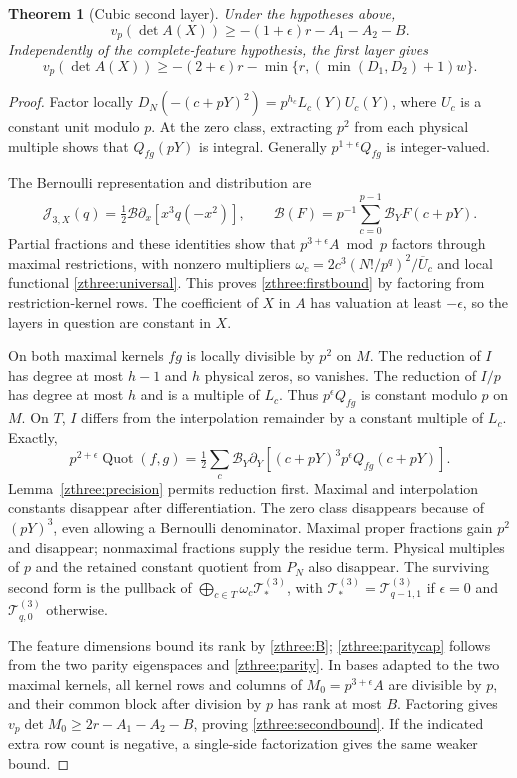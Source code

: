\documentclass[11pt]{article}
\newtheorem{theorem}{Theorem}[section]
\theoremstyle{definition}\newtheorem{definition}[theorem]{Definition}
\theoremstyle{remark}\newtheorem{remark}[theorem]{Remark}
\begin{document}
\begin{theorem}[Cubic second layer]\label{zthree:second}
Under the hypotheses above,
\begin{equation}\label{zthree:secondbound}
 v_p(\det A(X))\ge-(1+\epsilon)r-A_1-A_2-B.
\end{equation}
Independently of the complete-feature hypothesis, the first layer gives
\begin{equation}\label{zthree:firstbound}
 v_p(\det A(X))\ge-(2+\epsilon)r
       -\min\{r,(\min(D_1,D_2)+1)w\}.
\end{equation}
\end{theorem}
\begin{proof}
Factor locally
$D_N(-(c+pY)^2)=p^{h_c}L_c(Y)U_c(Y)$, where $U_c$ is a constant
unit modulo $p$. At the zero class, extracting $p^2$ from each
physical multiple shows that $Q_{fg}(pY)$ is integral. Generally
$p^{1+\epsilon}Q_{fg}$ is integer-valued.

The Bernoulli representation and distribution are
\[
 \mathcal J_{3,X}(q)=\tfrac12\mathcal B\partial_x[x^3q(-x^2)],
 \qquad
 \mathcal B(F)=p^{-1}\sum_{c=0}^{p-1}\mathcal B_Y F(c+pY).
\]
Partial fractions and these identities show that
$p^{3+\epsilon}A\bmod p$ factors through maximal restrictions,
with nonzero multipliers
$\omega_c=2c^3(N!/p^q)^2/\overline U_c$ and local functional
\eqref{zthree:universal}. This proves \eqref{zthree:firstbound} by
factoring from restriction-kernel rows. The coefficient of $X$ in
$A$ has valuation at least $-\epsilon$, so the layers in question
are constant in $X$.

On both maximal kernels $fg$ is locally divisible by $p^2$ on $M$.
The reduction of $I$ has degree at most $h-1$ and $h$ physical zeros,
so vanishes. The reduction of $I/p$ has degree at most $h$ and is
a multiple of $L_c$. Thus $p^\epsilon Q_{fg}$ is constant modulo
$p$ on $M$. On $T$, $I$ differs from the interpolation remainder
by a constant multiple of $L_c$. Exactly,
\[
 p^{2+\epsilon}\operatorname{Quot}(f,g)
 =\tfrac12\sum_c\mathcal B_Y\partial_Y
       [(c+pY)^3p^\epsilon Q_{fg}(c+pY)].
\]
Lemma~\ref{zthree:precision} permits reduction first. Maximal and
interpolation constants disappear after differentiation. The zero
class disappears because of $(pY)^3$, even allowing a Bernoulli
denominator. Maximal proper fractions gain $p^2$ and disappear;
nonmaximal fractions supply the residue term. Physical multiples
of $p$ and the retained constant quotient from $P_N$ also disappear.
The surviving second form is the pullback of
$\bigoplus_{c\in T}\omega_c\mathcal T_*^{(3)}$, with
$\mathcal T_*^{(3)}=\mathcal T_{q-1,1}^{(3)}$ if $\epsilon=0$ and
$\mathcal T_{q,0}^{(3)}$ otherwise.

The feature dimensions bound its rank by \eqref{zthree:B};
\eqref{zthree:paritycap} follows from the two parity eigenspaces and
\eqref{zthree:parity}. In bases adapted to the two maximal kernels,
all kernel rows and columns of $M_0=p^{3+\epsilon}A$ are divisible
by $p$, and their common block after division by $p$ has rank at
most $B$. Factoring gives
$v_p\det M_0\ge2r-A_1-A_2-B$, proving \eqref{zthree:secondbound}.
If the indicated extra row count is negative, a single-side
factorization gives the same weaker bound.
\end{proof}
\end{document}
